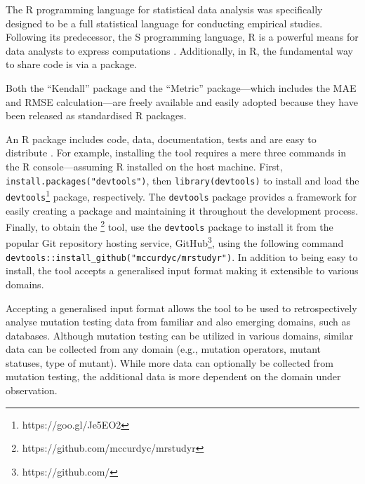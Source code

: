 The R programming language for statistical data analysis was specifically designed to
be a full statistical language for conducting empirical studies. Following its predecessor, the S programming
language, R is a powerful means for data analysts to express computations \cite{ihaka1996r}.
Additionally, in R, the fundamental way to share code is via a package.

Both the ``Kendall'' package and the ``Metric'' package---which includes
the MAE and RMSE calculation---are freely available and easily adopted because
they have been released as standardised R packages.

An R package includes code, data, documentation, tests and are easy to distribute \cite{wickham2015r}.
For example, installing the \mr tool requires a mere three commands in the R console---assuming R installed on the host machine.
First, \texttt{install.packages("devtools")}, then \texttt{library(devtools)} to install and load the \texttt{devtools}\footnote{https://goo.gl/Je5EO2} package, respectively.
The \texttt{devtools} package provides a framework for easily creating a package and maintaining it throughout the development process.
Finally, to obtain the \mr\footnote{https://github.com/mccurdyc/mrstudyr} tool, use the \texttt{devtools} package to install it
from the popular Git repository hosting service, GitHub\footnote{https://github.com/}, using the following command \texttt{devtools::install\_github("mccurdyc/mrstudyr")}.
In addition to being easy to install, the \mr tool accepts a generalised input format making
it extensible to various domains.

Accepting a generalised input format allows the \mr tool to be used to retrospectively analyse mutation testing
data from familiar and also emerging domains, such as databases. Although mutation
testing can be utilized in various domains, similar data can be collected from any
domain (e.g., mutation operators, mutant statuses, type of mutant). While more data
can optionally be collected from mutation testing, the additional data is more
dependent on the domain under observation.

